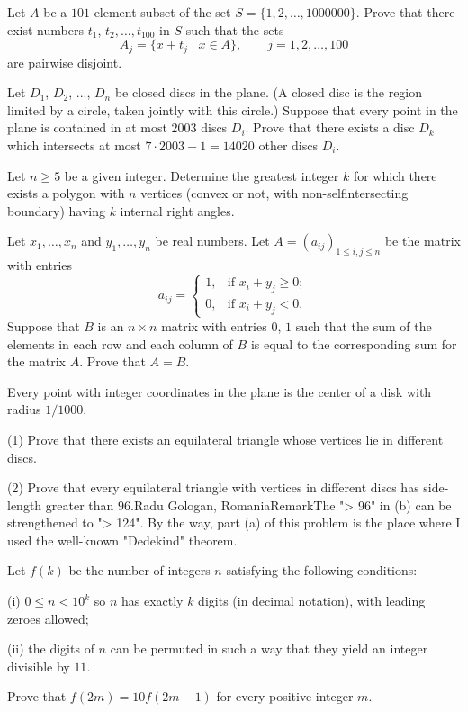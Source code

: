 \item[\textbf{C1.}]Let $A$ be a $101$-element subset of the set $S=\{1,2,\ldots,1000000\}$. Prove that there exist numbers $t_1$,  $t_2, \ldots, t_{100}$ in $S$ such that the sets  \[ A_j=\{x+t_j\mid x\in A\},\qquad j=1,2,\ldots,100  \]  are pairwise disjoint.
\item[\textbf{C2.}]Let $D_1$,  $D_2$,  ..., $D_n$ be closed discs in the plane. (A closed disc is the region limited by a circle, taken jointly with this circle.) Suppose that every point in the plane is contained in at most $2003$ discs $D_i$. Prove that there exists a disc $D_k$ which intersects at most $7\cdot 2003 - 1 = 14020$ other discs $D_i$.
\item[\textbf{C3.}]Let $n \geq 5$ be a given integer.  Determine the greatest integer $k$ for which there exists a polygon with $n$ vertices (convex or not, with non-selfintersecting boundary) having $k$ internal right angles.
\item[\textbf{C4.}]Let $x_1,\ldots, x_n$ and $y_1,\ldots, y_n$ be real numbers.  Let $A = (a_{ij})_{1\leq i,j\leq n}$ be the matrix with entries \[a_{ij} = \begin{cases}1,&\text{if }x_i + y_j\geq 0;\\0,&\text{if }x_i + y_j < 0.\end{cases}\]Suppose that $B$ is an $n\times n$ matrix with entries $0$,  $1$ such that the sum of the elements in each row and each column of $B$ is equal to the corresponding sum for the matrix $A$.  Prove that $A=B$.
\item[\textbf{C5.}]Every point with integer coordinates in the plane is the center of a disk with radius $1/1000$.

(1) Prove that there exists an equilateral triangle whose vertices lie in different discs.

(2) Prove that every equilateral triangle with vertices in different discs has side-length greater than $96$.Radu Gologan, RomaniaRemarkThe "> 96" in (b) can be strengthened to "> 124". By the way, part (a) of this problem is the place where I used the well-known "Dedekind" theorem.
\item[\textbf{C6.}]Let $f(k)$ be the number of integers $n$ satisfying the following conditions:

(i) $0\leq n < 10^k$ so $n$ has exactly $k$ digits (in decimal notation), with leading zeroes allowed;

(ii) the digits of $n$ can be permuted in such a way that they yield an integer divisible by $11$.

Prove that $f(2m) = 10f(2m-1)$ for every positive integer $m$.